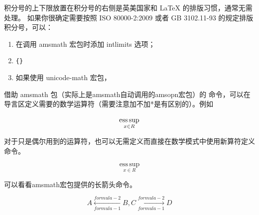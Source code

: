 

积分号的上下限放置在积分号的右侧是英美国家和 \LaTeX{}
的排版习惯，通常无需处理。
如果你很确定需要按照 ISO 80000-2:2009 或者 GB 3102.11-93 的规定排版积分号，可以：

\begin{enumerate}
\def\labelenumi{\arabic{enumi}.}

\item
  在调用 amsmath 宏包时添加 intlimits 选项；
\item
  \texttt{\{\}}
\item
  如果使用 unicode-math 宏包，
\end{enumerate}

\begin{texlist}
\removenolimits{%
  \int\iint\iiint\iiiint\oint\oiint\oiiint
  \intclockwise\varointclockwise\ointctrclockwise\sumint
  \intbar\intBar\fint\cirfnint\awint\rppolint
  \scpolint\npolint\pointint\sqint\intlarhk\intx
  \intcap\intcup\upint\lowint
}
\end{texlist}



借助 amsmath 包（实际上是amsmath自动调用的amsopn宏包）的
 命令，可以在导言区定义需要的数学运算符（需要注意加不加*是有区别的）。例如

\begin{texlist}
\DeclareMathOperator*{\esssup}{ess\,sup}
\end{texlist}

\begin{example}
\[ 
  \esssup_{x\in {R}} 
\]
\end{example}


对于只是偶尔用到的运算符，也可以无需定义而直接在数学模式中使用新算符定义命令。
%

\begin{example}
\[
  \operatorname*{ess\,sup}_{x\in {R}}
\]
\end{example}


可以看看amsmath宏包提供的长箭头命令。
\begin{example}
\[
  A \xleftarrow[formula-1]{formula-2} B,
  C \xrightarrow[formula-1]{formula-2} D
\]

\end{example}

